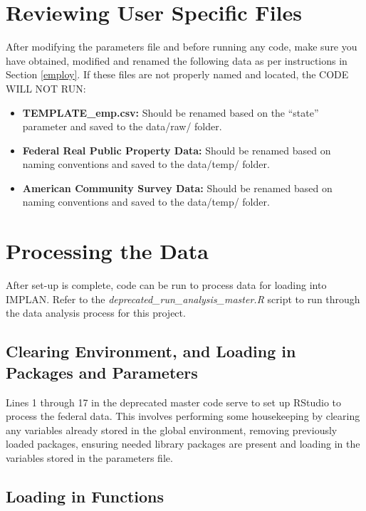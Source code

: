 \documentclass[
]{book}
\providecommand{\tightlist}{%
  \setlength{\itemsep}{0pt}\setlength{\parskip}{0pt}}
\begin{document}
\hypertarget{review-files}{%
\section{Reviewing User Specific Files}\label{review-files}}

After modifying the parameters file and before running any code, make sure you have obtained, modified and renamed the following data as per instructions in Section \ref{employ}. If these files are not properly named and located, the CODE WILL NOT RUN:

\begin{itemize}
\tightlist
\item
  \textbf{TEMPLATE\_emp.csv:} Should be renamed based on the ``state'' parameter and saved to the data/raw/ folder.\\
\item
  \textbf{Federal Real Public Property Data:} Should be renamed based on naming conventions and saved to the data/temp/ folder.\\
\item
  \textbf{American Community Survey Data:} Should be renamed based on naming conventions and saved to the data/temp/ folder.
\end{itemize}

\hypertarget{processing-data}{%
\section{Processing the Data}\label{processing-data}}

After set-up is complete, code can be run to process data for loading into IMPLAN. Refer to the \emph{deprecated\_run\_analysis\_master.R} script to run through the data analysis process for this project.

\hypertarget{set-up-env}{%
\subsection{Clearing Environment, and Loading in Packages and Parameters}\label{set-up-env}}

Lines 1 through 17 in the deprecated master code serve to set up RStudio to process the federal data. This involves performing some housekeeping by clearing any variables already stored in the global environment, removing previously loaded packages, ensuring needed library packages are present and loading in the variables stored in the parameters file.

\hypertarget{load-functions}{%
\subsection{Loading in Functions}\label{load-functions}}
\end{document}
